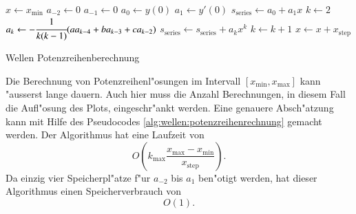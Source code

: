 \begin{algorithm}
	\begin{algorithmic}[1]
		\State $x \gets x_{\text{min}}$
			\State $a_{-2} \gets 0$
			\State $a_{-1} \gets 0$
			\State $a_0 \gets y(0)$
			\State $a_1 \gets y'(0)$
			\State $s_{\text{series}} \gets a_0 + a_1x$
			\State $k \gets 2$
				\State $a_k \gets -\cfrac{1}{k(k-1)}			
				(aa_{k-4}+ba_{k-3}+ca_{k-2})$
				\State $s_{\text{series}} \gets s_{\text{series}} + a_k x^k$
				\State $k \gets k + 1$
			\EndFor
			\State $x \gets x + x_{\text{step}}$
		\EndFor
	\end{algorithmic}
	\caption{Wellen Potenzreihenberechnung} 
	\label{alg:wellen:potenzreihenrechnung}
\end{algorithm}

Die Berechnung von Potenzreihenl"osungen im Intervall
$[x_{\text{min}},x_{\text{max}}]$ kann "ausserst lange dauern. Auch hier muss 
die Anzahl Berechnungen, in diesem Fall die Aufl"osung des Plots, 
eingeschr"ankt werden. Eine genauere Absch"atzung kann mit Hilfe des 
Pseudocodes \ref{alg:wellen:potenzreihenrechnung} gemacht werden. Der 
Algorithmus hat eine Laufzeit von
\begin{equation*}
	O
	\left(
		k_{\text{max}}\frac{x_{\text{max}}-x_{\text{min}}}{x_{\text{step}}}
	\right).
\end{equation*}
Da einzig vier Speicherpl"atze f"ur $a_{-2}$ bis $a_1$ ben"otigt werden, hat 
dieser Algorithmus einen Speicherverbrauch von
\begin{equation*}
	O
	\left(
		1
	\right).
\end{equation*}